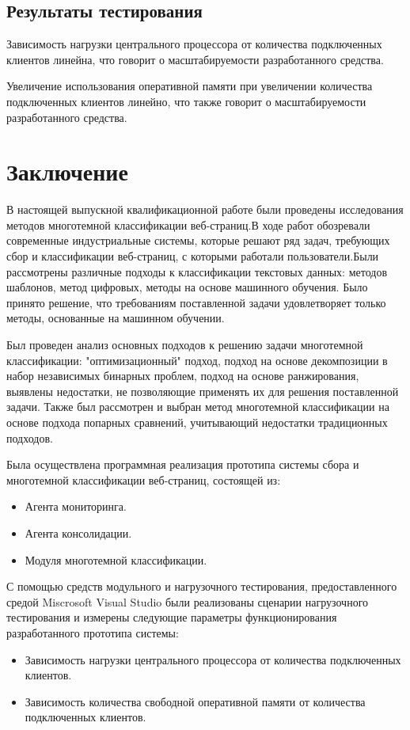 \documentclass[russian, utf8, emptystyle]{eskdtext}
\begin{document}
\subsection{Результаты тестирования}

Зависимость нагрузки центрального процессора от количества подключенных клиентов линейна, что говорит о масштабируемости разработанного средства.

Увеличение использования оперативной памяти при увеличении количества подключенных клиентов  линейно, что также говорит о масштабируемости разработанного средства.
\section {Заключение}
В настоящей выпускной квалификационной работе были проведены исследования методов многотемной классификации веб-страниц.В ходе работ обозревали современные индустриальные системы, которые решают ряд задач, требующих сбор и классификации веб-страниц, с которыми работали пользователи.Были рассмотрены различные подходы к классификации текстовых данных: методов шаблонов, метод цифровых, методы на основе машинного обучения. Было принято решение, что требованиям поставленной задачи удовлетворяет только методы, основанные на машинном обучении. 

Был проведен анализ основных подходов к решению задачи многотемной классификации: "оптимизационный" подход, подход на основе декомпозиции в набор независимых бинарных проблем, подход на основе ранжирования, выявлены недостатки, не позволяющие применять их для решения поставленной задачи. Также был рассмотрен и выбран метод многотемной классификации на основе подхода попарных сравнений, учитывающий недостатки традиционных подходов.



Была осуществлена программная реализация прототипа системы сбора и многотемной классификации веб-страниц, состоящей из:
\begin{itemize}
	\item Агента мониторинга.
	\item Агента консолидации.
	\item Модуля многотемной классификации.
\end{itemize}

С помощью средств модульного и нагрузочного тестирования, предоставленного средой Miscrosoft Visual Studio были реализованы сценарии нагрузочного тестирования и измерены следующие параметры функционирования разработанного прототипа системы:
\begin{itemize}
	\item Зависимость нагрузки центрального процессора от количества подключенных клиентов.
	\item Зависимость количества свободной оперативной памяти от количества подключенных клиентов.
\end{itemize}
\end{document}
